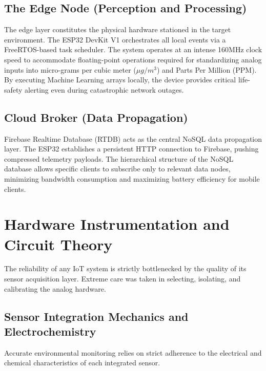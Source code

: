 \documentclass[12pt,journal,onecolumn,a4paper]{IEEEtran}
\begin{document}
\subsection{The Edge Node (Perception and Processing)}
The edge layer constitutes the physical hardware stationed in the target environment. The ESP32 DevKit V1 orchestrates all local events via a FreeRTOS-based task scheduler. 
The system operates at an intense 160MHz clock speed to accommodate floating-point operations required for standardizing analog inputs into micro-grams per cubic meter ($\mu g/m^3$) and Parts Per Million (PPM). By executing Machine Learning arrays locally, the device provides critical life-safety alerting even during catastrophic network outages.

\subsection{Cloud Broker (Data Propagation)}
Firebase Realtime Database (RTDB) acts as the central NoSQL data propagation layer. The ESP32 establishes a persistent HTTP connection to Firebase, pushing compressed telemetry payloads. The hierarchical structure of the NoSQL database allows specific clients to subscribe only to relevant data nodes, minimizing bandwidth consumption and maximizing battery efficiency for mobile clients.

\section{Hardware Instrumentation and Circuit Theory}
The reliability of any IoT system is strictly bottlenecked by the quality of its sensor acquisition layer. Extreme care was taken in selecting, isolating, and calibrating the analog hardware.

\subsection{Sensor Integration Mechanics and Electrochemistry}
Accurate environmental monitoring relies on strict adherence to the electrical and chemical characteristics of each integrated sensor. 
\end{document}

